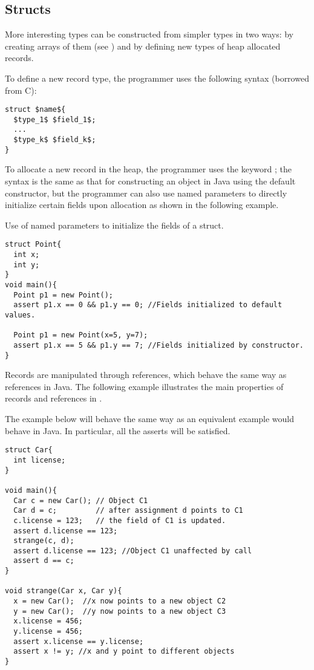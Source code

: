 \subsection{Structs}
More interesting types can be constructed from simpler types in two ways: by creating arrays of them (see ) and by defining new types of heap allocated records. 

To define a new record type, the programmer uses the following syntax (borrowed from C):
\begin{lstlisting}
struct $name${
  $type_1$ $field_1$;
  ...
  $type_k$ $field_k$;
}
\end{lstlisting}

To allocate a new record in the heap, the programmer uses the keyword ; the syntax is the same as that for constructing an object in Java using the default constructor, but the programmer can also use named parameters to directly initialize certain fields upon allocation as shown in the following example.

\begin{Example}
Use of named parameters to initialize the fields of a struct. 	
\begin{lstlisting}
struct Point{
  int x;
  int y;
}
void main(){
  Point p1 = new Point();
  assert p1.x == 0 && p1.y == 0; //Fields initialized to default values.

  Point p1 = new Point(x=5, y=7);
  assert p1.x == 5 && p1.y == 7; //Fields initialized by constructor.
}
\end{lstlisting}
\end{Example}

Records are manipulated through references, which behave the same way as references in Java. The following example illustrates the main properties of records and references in \Sk{}.

\begin{Example}
The example below will behave the same way as an equivalent example would behave in Java. In particular, all the asserts will be satisfied.
\begin{lstlisting}
struct Car{
  int license;
}

void main(){
  Car c = new Car(); // Object C1
  Car d = c;         // after assignment d points to C1
  c.license = 123;   // the field of C1 is updated.
  assert d.license == 123;
  strange(c, d);
  assert d.license == 123; //Object C1 unaffected by call
  assert d == c;
}

void strange(Car x, Car y){
  x = new Car();  //x now points to a new object C2
  y = new Car();  //y now points to a new object C3
  x.license = 456;
  y.license = 456;
  assert x.license == y.license;
  assert x != y; //x and y point to different objects
}
\end{lstlisting}

\end{Example}

